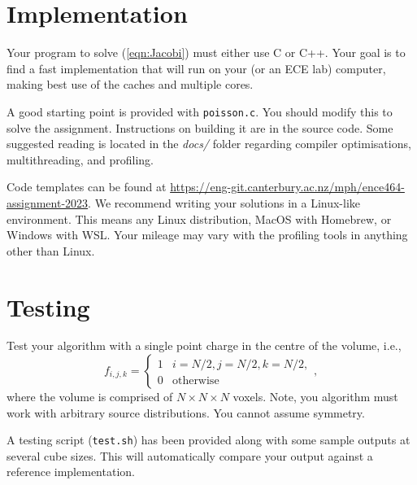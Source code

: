 \documentclass[a4paper,11pt]{article}
\newcommand{\code}[1]{\texttt{#1}}
\begin{document}
\section{Implementation}

Your program to solve (\ref{eqn:Jacobi}) must either use C or C++.  Your
goal is to find a fast implementation that will run on your (or an ECE
lab) computer, making best use of the caches and multiple cores.

A good starting point is provided with \code{poisson.c}. You should modify this
to solve the assignment. Instructions on building it are in the source code.
Some suggested reading is located in the \emph{docs/} folder regarding compiler
optimisations, multithreading, and profiling.



Code templates can be found at
\url{https://eng-git.canterbury.ac.nz/mph/ence464-assignment-2023}. We
recommend writing your solutions in a Linux-like environment. This
means any Linux distribution, MacOS with Homebrew, or Windows with
WSL. Your mileage may vary with the profiling tools in anything other
than Linux.


\section{Testing}

Test your algorithm with a single point charge in the centre of the
volume, i.e.,
%
\begin{equation}
  f_{i,j,k} = \left\{
  \begin{array}{ll}
    1 & i=N/2, j=N/2, k=N/2, \\
    0 & \mbox{otherwise}
  \end{array}\right.,
\end{equation}
%
where the volume is comprised of $N \times N \times N$ voxels.  Note,
you algorithm must work with arbitrary source distributions.  You
cannot assume symmetry.

A testing script (\code{test.sh}) has been provided along with some sample
outputs at several cube sizes. This will automatically compare your output
against a reference implementation.



\end{document}
